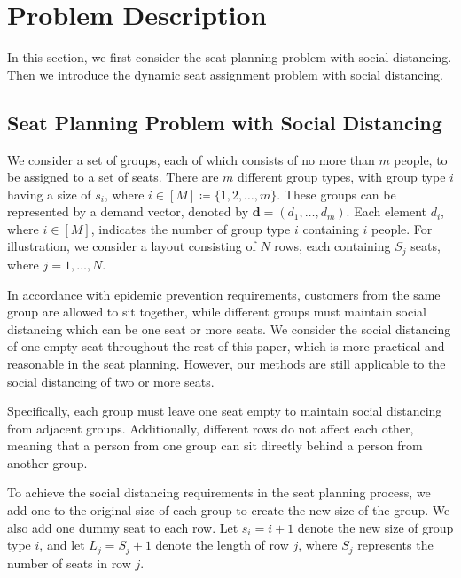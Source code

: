 \section{Problem Description}
In this section, we first consider the seat planning problem with social distancing. Then we introduce the dynamic seat assignment problem with social distancing.





\subsection{Seat Planning Problem with Social Distancing}\label{dynamic_demand}
We consider a set of groups, each of which consists of no more than $m$ people, to be assigned to a set of seats. There are $m$ different group types, with group type $i$ having a size of $s_i$, where $i \in [M] \coloneqq \{1,2, \ldots, m\}$. These groups can be represented by a demand vector, denoted by $\mathbf{d} = (d_1, \ldots, d_m)$. Each element $d_i$, where $i \in [M]$, indicates the number of group type $i$ containing $i$ people. For illustration, we consider a layout consisting of $N$ rows, each containing $S_j$ seats, where $j = 1, \ldots, N$.

In accordance with epidemic prevention requirements, customers from the same group are allowed to sit together, while different groups must maintain social distancing which can be one seat or more seats. We consider the social distancing of one empty seat throughout the rest of this paper, which is more practical and reasonable in the seat planning. However, our methods are still applicable to the social distancing of two or more seats.

Specifically, each group must leave one seat empty to maintain social distancing from adjacent groups. Additionally, different rows do not affect each other, meaning that a person from one group can sit directly behind a person from another group.

To achieve the social distancing requirements in the seat planning process, we add one to the original size of each group to create the new size of the group. We also add one dummy seat to each row. Let $s_i = i + 1$ denote the new size of group type $i$, and let $L_j = S_j + 1$ denote the length of row $j$, where $S_j$ represents the number of seats in row $j$.

